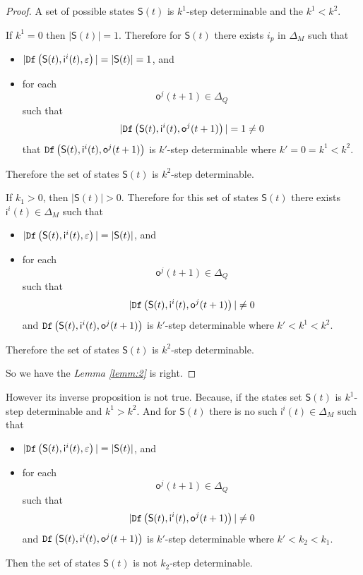 \begin{proof}
 A set of possible states $\mathsf{S}(t)$ is $k^1$-step determinable and the $k^1< k^2$. 
 
 If $k^1=0$ then $|\mathsf{S}(t)|=1$. Therefore for $\mathsf{S}(t)$ there exists $i_p$ in $\Delta_M$ such that
 \begin{itemize}
 \item  $|{\tt Df}\left(\mathsf{S}(t),\mathsf{i}^{i}(t),\varepsilon\right)|=|\mathsf{S}(t)|=1$, and 
 \item  for each \[\mathsf{o}^{j}(t+1)\in \Delta_Q\] such that \[|{\tt Df}\left(\mathsf{S}(t),\mathsf{i}^{i}(t),\mathsf{o}^{j}(t+1)\right)|=1\neq 0\] that ${\tt Df}\left(\mathsf{S}(t),\mathsf{i}^{i}(t),\mathsf{o}^{j}(t+1)\right)$ is $k'$-step determinable where ${k'}=0=k^1< k^2$.
 \end{itemize}
 Therefore the set of states $\mathsf{S}(t)$ is $k^2$-step determinable.
 
 If $k_1>0$, then $|\mathsf{S}(t)|>0$. Therefore for this set of states $\mathsf{S}(t)$ there exists $\mathsf{i}^{i}(t) \in \Delta_M$ such that
 \begin{itemize}
 \item  $|{\tt Df}\left(\mathsf{S}(t),\mathsf{i}^{i}(t),\varepsilon\right)|=|\mathsf{S}(t)|$, and 
 \item  for each \[\mathsf{o}^{j}(t+1)\in \Delta_Q\] such that \[|{\tt Df}\left(\mathsf{S}(t),\mathsf{i}^{i}(t),\mathsf{o}^{j}(t+1)\right)|\neq 0\] and ${\tt Df}\left(\mathsf{S}(t),\mathsf{i}^{i}(t),\mathsf{o}^{j}(t+1)\right)$ is $k'$-step determinable where ${k'}<k^1< k^2$.
 \end{itemize}
 Therefore the set of states $\mathsf{S}(t)$ is $k^2$-step determinable.

 So we have the {\em Lemma \ref{lemm:2}} is right.
\end{proof}

However its inverse proposition is not true. Because, if the states set $\mathsf{S}(t)$ is $k^1$-step determinable and $k^1> k^2$. And for $\mathsf{S}(t)$ there is no such $\mathsf{i}^{i}(t) \in\Delta_M$ such that
 \begin{itemize}
 \item  $|{\tt Df}\left(\mathsf{S}(t),\mathsf{i}^{i}(t),\varepsilon\right)|=|\mathsf{S}(t)|$, and 
 \item  for each \[\mathsf{o}^{j}(t+1)\in \Delta_Q\] such that \[|{\tt Df}\left(\mathsf{S}(t),\mathsf{i}^{i}(t),\mathsf{o}^{j}(t+1)\right)|\neq 0\] and ${\tt Df}\left(\mathsf{S}(t),\mathsf{i}^{i}(t),\mathsf{o}^{j}(t+1)\right)$ is $k'$-step determinable where ${k'}<k_2<k_1$.
 \end{itemize}
 Then the set of states $\mathsf{S}(t)$ is not $k_2$-step determinable.

